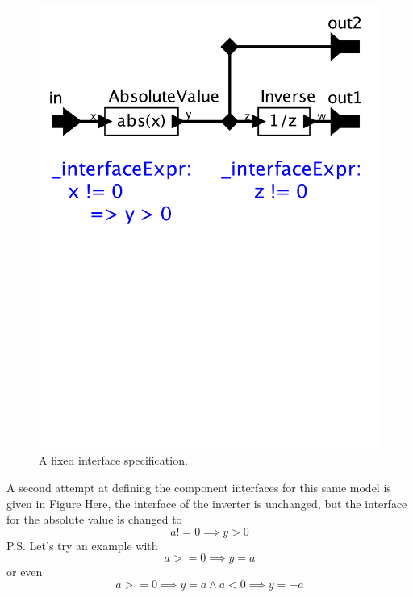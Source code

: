 \documentclass[preprint,11pt,authoryear]{sigplanconf}
\begin{document}
\begin{figure}[htbp]
\centering
\includegraphics[width=\columnwidth]{figs/absoluteCorrected}
\caption{A fixed interface specification.}
\label{fig:absoluteCorrected}
\end{figure}

A second attempt at defining the component interfaces for this same model is given in Figure%
Here, the interface of the inverter is unchanged, but the interface for the absolute value is changed to
\[
a != 0 \implies y > 0
\]
P.S. Let's try an example with \[ a >= 0 \implies y = a\] or even \[a >= 0 \implies y = a  \wedge a < 0 \implies y = -a\]
\end{document}
